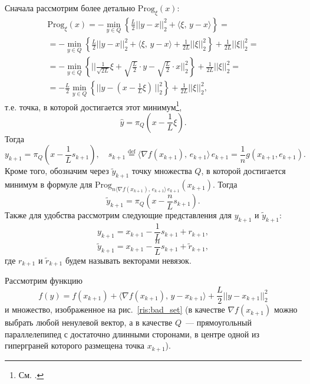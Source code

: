 \documentclass[11pt]{article}
\def\Prog{\text{Prog}}
\begin{document}
     Сначала рассмотрим более детально $\Prog_{\xi}(x)$:
		\begin{equation*}
			\begin{array}{l}
				\Prog_{\xi}(x) = - \underset{y\in Q}{\min}\left\{\frac{L}{2}\Big|\Big| y-x \Big|\Big|_2^2 + \langle\xi, \, y-x\rangle \right\} =\\= - \underset{y\in Q}{\min}\left\{\frac{L}{2}\Big|\Big| y-x \Big|\Big|_2^2 + \langle\xi, \, y-x\rangle + \frac{1}{2L}\Big|\Big| \xi \Big|\Big|_2^2 \right\} + \frac{1}{2L}\Big|\Big| \xi \Big|\Big|_2^2=\\ 
				= - \underset{y\in Q}{\min}\left\{\Big|\Big|\frac{1}{\sqrt{2L}}\xi + \sqrt{\frac{L}{2}}\cdot y - \sqrt{\frac{L}{2}}\cdot x \Big|\Big|_2^2 \right\} + \frac{1}{2L}\Big|\Big| \xi \Big|\Big|_2^2=\\ = -\frac{L}{2}\underset{y\in Q}{\min}\left\{\Big|\Big| y - \left(x - \frac{1}{L}\xi\right) \, \Big|\Big|_2^2 \right\} + \frac{1}{2L}\Big|\Big| \xi \Big|\Big|_2^2,
			\end{array}
		\end{equation*}
		т.е. точка, в которой достигается этот минимум\footnote{См. \cite{Gasn_Universal_2018}.},
		$$
		\hat{y} = \pi_Q\left(x-\frac{1}{L}\xi\right).
		$$
		Тогда
		$$
		y_{k+1} = \pi_Q\left(x-\frac{1}{L}s_{k+1}\right), \quad s_{k+1} \overset{\text{def}}{=} \langle\nabla f(x_{k+1}), \, e_{k+1}\rangle \, e_{k+1} = \frac{1}{n}g(x_{k+1},e_{k+1}).
		$$
		Кроме того, обозначим через $\widetilde{y}_{k+1}$ точку множества $Q$, в которой достигается минимум в формуле для $\Prog_{n\langle\nabla f(x_{k+1}), \, e_{k+1}\rangle \, e_{k+1}}(x_{k+1})$. Тогда
		$$
		\widetilde{y}_{k+1} = \pi_Q\left(x-\frac{n}{L}s_{k+1}\right).
		$$
		Также для удобства рассмотрим следующие представления для $y_{k+1}$ и $\widetilde{y}_{k+1}$:
		\begin{equation}\label{example:representation_y_k+1}
		    y_{k+1} = x_{k+1} - \frac{1}{L}s_{k+1} + r_{k+1},
		\end{equation}
		$$
		\widetilde{y}_{k+1} = x_{k+1} - \frac{n}{L}s_{k+1} + \widetilde{r}_{k+1},
		$$
		где $r_{k+1}$ и $\widetilde{r}_{k+1}$ будем называть векторами невязок.



		Рассмотрим функцию
		\begin{equation}\label{bad_function}
			f(y) = f(x_{k+1}) + \langle\nabla f(x_{k+1}), \, y-x_{k+1}\rangle + \frac{L}{2}\Big|\Big|y-x_{k+1}\Big|\Big|_2^2
		\end{equation}
		и множество, изображенное на рис.~\ref{ris:bad_set} (в качестве $\nabla f(x_{k+1})$ можно выбрать любой ненулевой вектор, а в качестве $Q$~--- прямоугольный параллелепипед с достаточно длинными сторонами, в центре одной из гиперграней которого размещена точка $x_{k+1}$).
\end{document}
